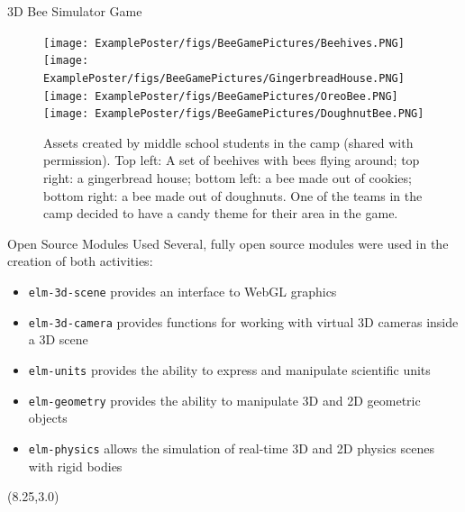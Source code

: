 \documentclass[22pt]{beamer}
\begin{document}
\begin{frame}[fragile]
\begin{textblock}{7.25}
\begin{block}{3D Bee Simulator Game}
\begin{figure}
    \centering
    \texttt{[image: ExamplePoster/figs/BeeGamePictures/Beehives.PNG]}\hspace{0.3cm}
    \texttt{[image: ExamplePoster/figs/BeeGamePictures/GingerbreadHouse.PNG]}\\
    \vspace{0.5cm}
    \texttt{[image: ExamplePoster/figs/BeeGamePictures/OreoBee.PNG]}
    \texttt{[image: ExamplePoster/figs/BeeGamePictures/DoughnutBee.PNG]}
    \caption{Assets created by middle school students in the camp (shared with permission). Top left: A set of beehives with bees flying around; top right: a gingerbread house; bottom left: a bee made out of cookies; bottom right: a bee made out of doughnuts. One of the teams in the camp decided to have a candy theme for their area in the game.}
\end{figure}

\end{block}

\begin{block}{Open Source Modules Used}
Several, fully open source modules were used in the creation of both activities:

\begin{itemize}
    \item \texttt{elm-3d-scene} provides an interface to WebGL graphics
    \item \texttt{elm-3d-camera} provides functions for working with virtual 3D cameras inside a 3D scene
    \item \texttt{elm-units} provides the ability to express and manipulate scientific units
    \item \texttt{elm-geometry} provides the ability to manipulate 3D and 2D geometric objects
    \item \texttt{elm-physics} allows the simulation of real-time 3D and 2D physics scenes with rigid bodies
\end{itemize}

\end{block}


\end{textblock}



\begin{textblock}{7.25}(8.25,3.0)


\end{textblock}
\end{frame}
\end{document}
